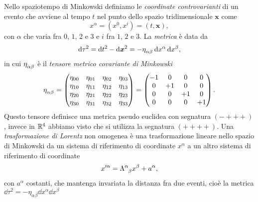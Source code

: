 Nello spaziotempo di Minkowski definiamo le
\emph{coordinate controvarianti} di un evento
che avviene al tempo $t$ nel punto dello spazio tridimensionale $\bm{x}$ come
\begin{equation}
  \label{eq:coord-controvariante}
  x^{\alpha} = (x^{0},x^{i}) = (t, \bm{x}),
\end{equation}
con $\alpha$ che varia fra $0$, $1$, $2$ e $3$ e $i$ fra $1$, $2$ e $3$.  La
\emph{metrica} è data da
\begin{equation}
  \dd \tau^{2} = \dd t^{2} - \dd \bm{x}^{2} = -\tensor{\eta}{_{\alpha\beta}}\dd
  x^{\alpha} \dd x^{\beta},
\end{equation}
in cui $\tensor{\eta}{_{\alpha\beta}}$ è il
\emph{tensore metrico covariante di Minkowski}
\begin{equation}
  \label{eq:tensore-metrico-controvariante}
  \tensor{\eta}{_{\alpha\beta}} =
  \begin{pmatrix}
   \eta_{00} & \eta_{01} & \eta_{02} & \eta_{03} \\
   \eta_{10} & \eta_{11} & \eta_{12} & \eta_{13} \\
   \eta_{20} & \eta_{21} & \eta_{22} & \eta_{23} \\
   \eta_{30} & \eta_{31} & \eta_{32} & \eta_{33}
  \end{pmatrix}
  =
  \begin{pmatrix}
    -1 & 0  & 0  & 0 \\
    0  & +1 & 0  & 0 \\
    0  & 0  & +1 & 0 \\
    0  & 0  & 0  & +1
  \end{pmatrix}.
\end{equation}
Questo tensore definisce una metrica pseudo euclidea con segnatura $(-+++)$,
invece in $\mathbb{R}^{4}$ abbiamo visto che si utilizza la segnatura $(++++)$.  Una
\emph{trasformazione di Lorentz} non omogenea è
una trasformazione lineare nello spazio di Minkowski da un sistema di
riferimento di coordinate $x^{\alpha}$ a un altro sistema di riferimento di
coordinate
\begin{equation}
  \label{eq:trasformazione-lineare}
  x'^{\alpha} = \tensor{\Lambda}{^{\alpha}_{\beta}}x^{\beta} + a^{\alpha},
\end{equation}
con $a^{\alpha}$ costanti, che mantenga invariata la distanza fra due eventi,
cioè la metrica $\dd\tau^{2} = -\eta_{\alpha\beta}\dd x^{\alpha}\dd x^{\beta}$
